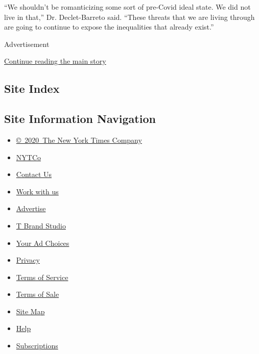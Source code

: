 ``We shouldn't be romanticizing some sort of pre-Covid ideal state. We
did not live in that,'' Dr. Declet-Barreto said. ``These threats that we
are living through are going to continue to expose the inequalities that
already exist.''

Advertisement

\protect\hyperlink{after-bottom}{Continue reading the main story}

\hypertarget{site-index}{%
\subsection{Site Index}\label{site-index}}

\hypertarget{site-information-navigation}{%
\subsection{Site Information
Navigation}\label{site-information-navigation}}

\begin{itemize}
\tightlist
\item
  \href{https://help.nytimes3xbfgragh.onion/hc/en-us/articles/115014792127-Copyright-notice}{©~2020~The
  New York Times Company}
\end{itemize}

\begin{itemize}
\tightlist
\item
  \href{https://www.nytco.com/}{NYTCo}
\item
  \href{https://help.nytimes3xbfgragh.onion/hc/en-us/articles/115015385887-Contact-Us}{Contact
  Us}
\item
  \href{https://www.nytco.com/careers/}{Work with us}
\item
  \href{https://nytmediakit.com/}{Advertise}
\item
  \href{http://www.tbrandstudio.com/}{T Brand Studio}
\item
  \href{https://www.nytimes3xbfgragh.onion/privacy/cookie-policy\#how-do-i-manage-trackers}{Your
  Ad Choices}
\item
  \href{https://www.nytimes3xbfgragh.onion/privacy}{Privacy}
\item
  \href{https://help.nytimes3xbfgragh.onion/hc/en-us/articles/115014893428-Terms-of-service}{Terms
  of Service}
\item
  \href{https://help.nytimes3xbfgragh.onion/hc/en-us/articles/115014893968-Terms-of-sale}{Terms
  of Sale}
\item
  \href{https://spiderbites.nytimes3xbfgragh.onion}{Site Map}
\item
  \href{https://help.nytimes3xbfgragh.onion/hc/en-us}{Help}
\item
  \href{https://www.nytimes3xbfgragh.onion/subscription?campaignId=37WXW}{Subscriptions}
\end{itemize}
